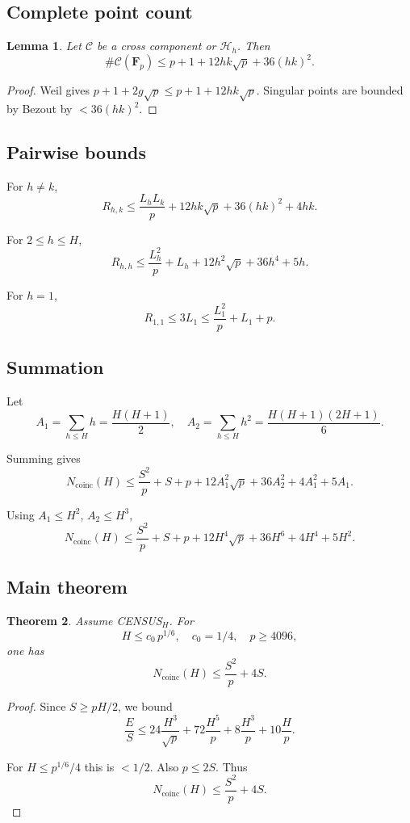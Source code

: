 \documentclass[11pt]{article}
\newtheorem{theorem}{Theorem}
\newtheorem{lemma}[theorem]{Lemma}
\theoremstyle{remark}
\newcommand{\Fp}{\mathbf F_p}
\newcommand{\Ncoinc}{N_{\mathrm{coinc}}}
\begin{document}
\subsection*{Complete point count}

\begin{lemma}
Let $\mathcal C$ be a cross component or $\mathcal H_h$.
Then
\[
\#\mathcal C(\Fp)
\le p + 1 + 12hk \sqrt{p} + 36 (hk)^2.
\]
\end{lemma}

\begin{proof}
Weil gives $p+1+2g\sqrt p \le p+1+12hk\sqrt p$.
Singular points are bounded by Bezout by $< 36(hk)^2$.
\end{proof}

\subsection*{Pairwise bounds}

For $h \ne k$,
\[
R_{h,k}
\le \frac{L_h L_k}{p}
+ 12hk \sqrt p
+ 36 (hk)^2
+ 4hk.
\]

For $2 \le h \le H$,
\[
R_{h,h}
\le \frac{L_h^2}{p}
+ L_h
+ 12h^2 \sqrt p
+ 36 h^4
+ 5h.
\]

For $h=1$,
\[
R_{1,1} \le 3 L_1 \le \frac{L_1^2}{p} + L_1 + p.
\]

\subsection*{Summation}

Let
\[
A_1 = \sum_{h\le H} h = \frac{H(H+1)}{2},
\quad
A_2 = \sum_{h\le H} h^2 = \frac{H(H+1)(2H+1)}{6}.
\]

Summing gives
\[
\Ncoinc(H)
\le \frac{S^2}{p} + S + p
+ 12 A_1^2 \sqrt p
+ 36 A_2^2
+ 4 A_1^2
+ 5 A_1.
\]

Using $A_1 \le H^2$, $A_2 \le H^3$,
\[
\Ncoinc(H)
\le \frac{S^2}{p} + S + p
+ 12 H^4 \sqrt p
+ 36 H^6
+ 4 H^4
+ 5 H^2.
\]

\subsection*{Main theorem}

\begin{theorem}
Assume CENSUS$_H$.
For
\[
H \le c_0 \, p^{1/6}, \quad c_0 = 1/4, \quad p \ge 4096,
\]
one has
\[
\boxed{
\Ncoinc(H) \le \frac{S^2}{p} + 4S.
}
\]
\end{theorem}

\begin{proof}
Since $S \ge pH/2$, we bound
\[
\frac{E}{S}
\le 24 \frac{H^3}{\sqrt p}
+ 72 \frac{H^5}{p}
+ 8 \frac{H^3}{p}
+ 10 \frac{H}{p}.
\]

For $H \le p^{1/6}/4$ this is $< 1/2$.
Also $p \le 2S$.
Thus
\[
\Ncoinc(H) \le \frac{S^2}{p} + 4S.
\]
\end{proof}
\end{document}
